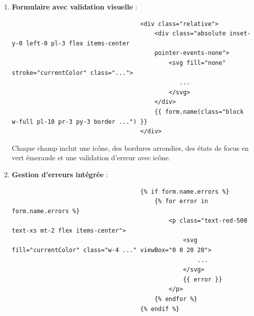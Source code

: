 \documentclass[a4paper,11pt]{article}
\begin{document}
\begin{enumerate}
                        \item \textbf{Formulaire avec validation visuelle} :
                            \begin{tcolorbox}[colback=lightgray!6, colframe=black, left=-70mm, right=5mm, top=2mm, bottom=0mm, boxrule=0.1mm]
                                \begin{verbatim}
                                    <div class="relative">
                                        <div class="absolute inset-y-0 left-0 pl-3 flex items-center 
                                        pointer-events-none">
                                            <svg fill="none" stroke="currentColor" class="...">
                                               ...
                                            </svg>
                                        </div>
                                        {{ form.name(class="block w-full pl-10 pr-3 py-3 border ...") }}
                                    </div>
                                \end{verbatim}
                            \end{tcolorbox}

                            \noindent Chaque champ inclut une icône, des bordures arrondies, des états de focus en vert émeraude et une validation d'erreur avec icône.

                        \item \textbf{Gestion d'erreurs intégrée} :
                            \begin{tcolorbox}[colback=lightgray!6, colframe=black, left=-60mm, right=5mm, top=2mm, bottom=0mm, boxrule=0.1mm]
                                \begin{verbatim}
                                    {% if form.name.errors %}
                                        {% for error in form.name.errors %}
                                            <p class="text-red-500 text-xs mt-2 flex items-center">
                                                <svg fill="currentColor" class="w-4 ..." viewBox="0 0 20 20">
                                                    ...
                                                </svg>
                                                {{ error }}
                                            </p>
                                        {% endfor %}
                                    {% endif %}
                                \end{verbatim}
                            \end{tcolorbox}
                    \end{enumerate}
\end{document}
